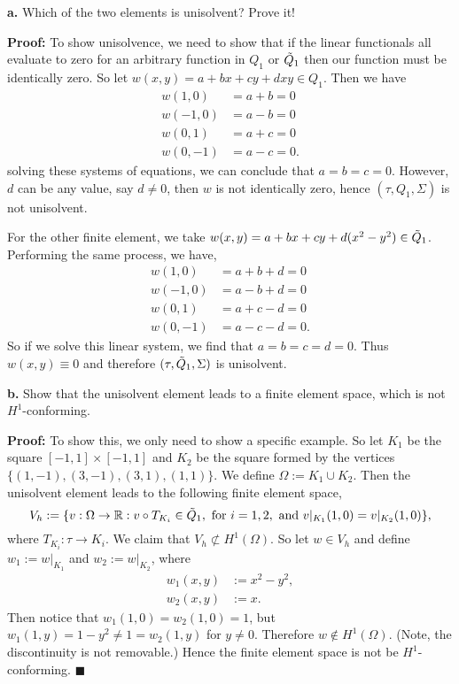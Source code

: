 \documentclass[11pt]{article}
\begin{document}
\vskip 1cm


\textbf{a.} Which of the two elements is unisolvent? Prove it!

\vskip 1cm 


\textbf{Proof:} To show unisolvence, we need to show that if the linear functionals all evaluate to zero for an arbitrary function in $Q_1$ or $\Tilde{Q}_1$ then our function must be identically zero.
So let $w(x,y) = a + bx + cy + dxy \in Q_1$.
Then we have 
\begin{align*}
    w(1,0) &= a + b = 0 \\ 
    w(-1,0) &= a - b = 0 \\
    w(0,1) &= a + c = 0 \\
    w(0,-1) &= a - c = 0.
\end{align*}
solving these systems of equations, we can conclude that $a = b = c =0$.
However, $d$ can be any value, say $d\neq 0$, then $w$ is not identically zero, hence $(\tau, Q_1, \Sigma)$ is not unisolvent.

For the other finite element, we take $w(x,y) = a + bx + cy + d(x^2 - y^2) \in \Tilde{Q}_1$. 
Performing the same process, we have,
\begin{align*}
    w(1,0) &= a + b + d = 0 \\
    w(-1,0) &= a - b + d = 0 \\
    w(0,1) &= a + c - d = 0 \\
    w(0,-1) &= a - c - d = 0.
\end{align*}
So if we solve this linear system, we find that $a = b = c = d = 0$.
Thus $w(x,y) \equiv 0$ and therefore $(\tau, \Tilde{Q}_1, \Sigma)$ is unisolvent.



\vskip 2cm


\textbf{b.} Show that the unisolvent element leads to a finite element space, which is not $H^1$-conforming.

\vskip 1cm


\textbf{Proof:} To show this, we only need to show a specific example. 
So let $K_1$ be the square $[-1,1]\times [-1,1]$ and $K_2$ be the square formed by the vertices $\{ (1,-1), (3,-1), (3,1), (1,1) \}$. 
We define $\Omega := K_1 \cup K_2$.
Then the unisolvent element leads to the following finite element space,
\begin{equation}
    V_h := \{ v : \Omega \to \mathbb{R} : v \circ T_{K_i} \in \Tilde{Q}_1, \text{ for } i = 1, 2, \text{ and } v|_{K_1}(1,0) = v|_{K_2}(1,0) \},
\end{equation}
where $T_{K_i} : \tau \to K_i$.
We claim that $V_h \not\subset H^1(\Omega)$.
So let $w \in V_h$ and define $w_1 := w|_{K_1}$ and $w_2 := w|_{K_2}$, where 
\begin{align*}
    w_1(x,y) &:= x^2 - y^2, \\
    w_2(x,y) &:= x.
\end{align*}
Then notice that $w_1(1,0) = w_2(1,0) = 1$, but $w_1(1,y) = 1 - y^2 \neq 1 = w_2(1,y)$ for $y\neq 0$.
Therefore $w \not\in H^1(\Omega)$. 
(Note, the discontinuity is not removable.)
Hence the finite element space is not be $H^1$-conforming.
$\blacksquare$
\end{document}
